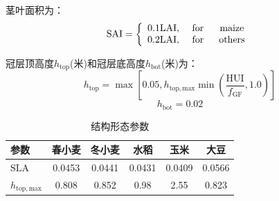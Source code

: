 茎叶面积为：
\begin{equation}
  {\rm SAI}=\left\{\begin{array}{lcc}0.1 {\rm LAI}, & \text { for } & \text { maize } \\
  0.2 {\rm LAI}, & \text { for } & \text {others}\end{array}\right.
\end{equation}

冠层顶高度$h_{\mathrm{top}}$(米)和冠层底高度$h_{\mathrm{bot}}$(米)为：
\begin{equation}
  h_{\mathrm{top}}=\max \left[0.05, h_{\mathrm{top,max}} \min \left(\frac{{\mathrm {HUI}}}{f_{\mathrm{GF}}}, 1.0\right)\right]
\end{equation}
\begin{equation}
  h_{\mathrm{b o t}}=0.02
\end{equation}

\begin{table}[htbp]
  \centering
  \caption{结构形态参数}
  \label{tab:结构形态参数}
  \begin{tabular}{@{}lccccc}
    \toprule
    参数                   & 春小麦 & 冬小麦 & 水稻   & 玉米   & 大豆   \\ \midrule
    ${\mathrm {SLA}}$      & 0.0453 & 0.0441 & 0.0431 & 0.0409 & 0.0566 \\
    $h_{\mathrm{top,max}}$ & 0.808  & 0.852  & 0.98   & 2.55   & 0.823  \\ \bottomrule
  \end{tabular}
\end{table}
